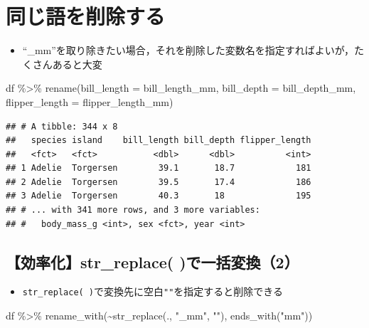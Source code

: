 \documentclass[
  xelatex,ja=standard, b5paper]{bxjsbook}
\newenvironment{Shaded}{\begin{snugshade}}{\end{snugshade}}
\newcommand{\AttributeTok}[1]{\textcolor[rgb]{0.77,0.63,0.00}{#1}}
\newcommand{\FunctionTok}[1]{\textcolor[rgb]{0.00,0.00,0.00}{#1}}
\newcommand{\NormalTok}[1]{#1}
\newcommand{\SpecialCharTok}[1]{\textcolor[rgb]{0.00,0.00,0.00}{#1}}
\newcommand{\StringTok}[1]{\textcolor[rgb]{0.31,0.60,0.02}{#1}}
\providecommand{\tightlist}{%
  \setlength{\itemsep}{0pt}\setlength{\parskip}{0pt}}
\begin{document}
\hypertarget{rename-remove}{%
\section{同じ語を削除する}\label{rename-remove}}

\begin{itemize}
\tightlist
\item
  ``\_mm''を取り除きたい場合，それを削除した変数名を指定すればよいが，たくさんあると大変
\end{itemize}

\begin{Shaded}
\begin{Highlighting}[]
\NormalTok{df }\SpecialCharTok{\%\textgreater{}\%} 
  \FunctionTok{rename}\NormalTok{(}\AttributeTok{bill\_length =}\NormalTok{ bill\_length\_mm,}
         \AttributeTok{bill\_depth  =}\NormalTok{ bill\_depth\_mm,}
         \AttributeTok{flipper\_length =}\NormalTok{ flipper\_length\_mm)}
\end{Highlighting}
\end{Shaded}

\begin{verbatim}
## # A tibble: 344 x 8
##   species island    bill_length bill_depth flipper_length
##   <fct>   <fct>           <dbl>      <dbl>          <int>
## 1 Adelie  Torgersen        39.1       18.7            181
## 2 Adelie  Torgersen        39.5       17.4            186
## 3 Adelie  Torgersen        40.3       18              195
## # ... with 341 more rows, and 3 more variables:
## #   body_mass_g <int>, sex <fct>, year <int>
\end{verbatim}

\hypertarget{rename-strreplace2}{%
\subsection{【効率化】str\_replace( )で一括変換（2）}\label{rename-strreplace2}}

\begin{itemize}
\tightlist
\item
  \texttt{str\_replace(\ )}で変換先に空白\texttt{""}を指定すると削除できる
\end{itemize}

\begin{Shaded}
\begin{Highlighting}[]
\NormalTok{df }\SpecialCharTok{\%\textgreater{}\%} 
  \FunctionTok{rename\_with}\NormalTok{(}\SpecialCharTok{\textasciitilde{}}\FunctionTok{str\_replace}\NormalTok{(., }\StringTok{"\_mm"}\NormalTok{, }\StringTok{""}\NormalTok{),}
              \FunctionTok{ends\_with}\NormalTok{(}\StringTok{"mm"}\NormalTok{))}
\end{Highlighting}
\end{Shaded}
\end{document}
